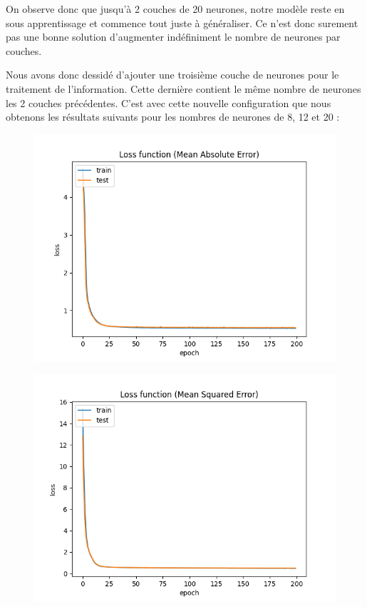 \vspace{1.5cm}

On observe donc que jusqu'à 2 couches de 20 neurones, notre modèle reste en sous apprentissage et commence tout juste à généraliser.
Ce n'est donc surement pas une bonne solution d'augmenter indéfiniment le nombre de neurones par couches.

Nous avons donc dessidé d'ajouter une troisième couche de neurones pour le traitement de l'information. Cette dernière contient le
même nombre de neurones les 2 couches précédentes. C'est avec cette nouvelle configuration que nous obtenons les résultats suivants pour
les nombres de neurones de 8, 12 et 20 :

\vspace*{1cm}

\begin{figure}[!htb]
    \begin{minipage}{0.5\textwidth}
        \centering
        \includegraphics[width=01\textwidth]{../images/11-8-8-8/Loss function(Mean Absolute Error).png}
        \label{fig:11-8-8-8-1.1}
    \end{minipage}\hfill
    \begin{minipage}{0.5\textwidth}
        \centering
        \includegraphics[width=01\textwidth]{../images/11-8-8-8/Loss function(Mean Squared Error).png}

\end{minipage}
\end{figure}
